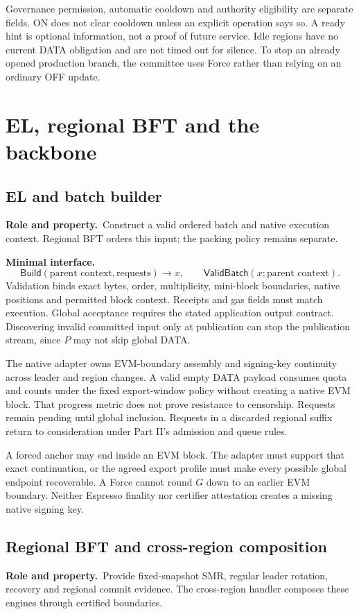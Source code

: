 \documentclass[11pt,a4paper]{article}
\newcommand{\api}[1]{\ensuremath{\mathsf{#1}}}
\newcommand{\role}{\textbf{Role and property.}\ }
\newcommand{\iface}{\textbf{Minimal interface.}\ }
\begin{document}
Governance permission, automatic cooldown and authority eligibility are
separate fields. ON does not clear cooldown unless an explicit operation
says so. A ready hint is optional information, not a proof of future
service. Idle regions have no current DATA obligation and are not timed
out for silence. To stop an already opened production branch, the
committee uses Force rather than relying on an ordinary OFF update.

\section{EL, regional BFT and the backbone}\label{sec:sequencing}
\subsection{EL and batch builder}
\role Construct a valid ordered batch and native execution context.
Regional BFT orders this input; the packing policy remains separate.

\iface
\[
 \api{Build}(\text{parent context},\text{requests})\to x,\qquad
 \api{ValidBatch}(x;\text{parent context}).
\]
Validation binds exact bytes, order, multiplicity, mini-block boundaries,
native positions and permitted block context. Receipts and gas fields
must match execution. Global acceptance requires the stated application
output contract. Discovering invalid committed input only at publication
can stop the publication stream, since $P$ may not skip global DATA.

The native adapter owns EVM-boundary assembly and signing-key continuity
across leader and region changes. A valid empty DATA payload consumes
quota and counts under the fixed export-window policy without creating
a native EVM block. That progress metric does not prove resistance to
censorship. Requests remain pending until global inclusion. Requests in
a discarded regional suffix return to consideration under Part II's
admission and queue rules.

A forced anchor may end inside an EVM block. The adapter must support
that exact continuation, or the agreed export profile must make every
possible global endpoint recoverable. A Force cannot round $G$ down to
an earlier EVM boundary. Neither Espresso finality nor certifier
attestation creates a missing native signing key.

\subsection{Regional BFT and cross-region composition}
\role Provide fixed-snapshot SMR, regular leader rotation, recovery and
regional commit evidence. The cross-region handler composes these
engines through certified boundaries.
\end{document}
